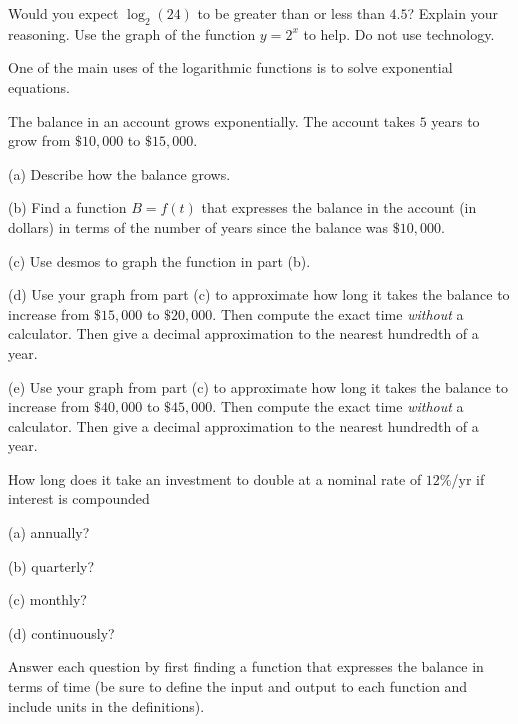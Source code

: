 \documentclass{ximera}
\begin{document}
\begin{question} \label{Q4:LogF}
Would you expect $\log_2(24)$ to be greater than or less than $4.5$? Explain your reasoning. Use the graph of the function $y=2^x$ to help. Do not use technology.
\end{question}



One of the main uses of the logarithmic functions is to solve exponential equations.


\begin{question}  \label{Q:dfehyyh5h}
The balance in an account grows exponentially. The account takes $5$ years to grow from $\$10,000$ to $\$15,000$. 

(a) Describe how the balance grows.

(b) Find a function $B = f(t)$ that expresses the balance in the account (in dollars) in terms of the number of years since the balance was $\$10,000$.

(c) Use desmos to graph the function in part (b). 

(d) Use your graph from part (c) to approximate how long it takes the balance to increase from $\$15,000$ to $\$20,000$. Then compute the exact time \emph{without} a calculator. Then give a decimal approximation to the nearest hundredth of a year.

(e) Use your graph from part (c) to approximate how long it takes the balance to increase from $\$40,000$ to $\$45,000$. Then compute the exact time \emph{without} a calculator. Then give a decimal approximation to the nearest hundredth of a year.

\end{question}

\begin{question}  \label{Q:DLDFLLLLL}
How long does it take an investment to double at a nominal rate of $12\%$/yr if interest is compounded

(a) annually?

(b) quarterly?

(c) monthly?

(d) continuously?

Answer each question by first finding a function that expresses the balance in terms of time (be sure to define the input and output to each function and include units in the definitions).

\end{question}
\end{document}
